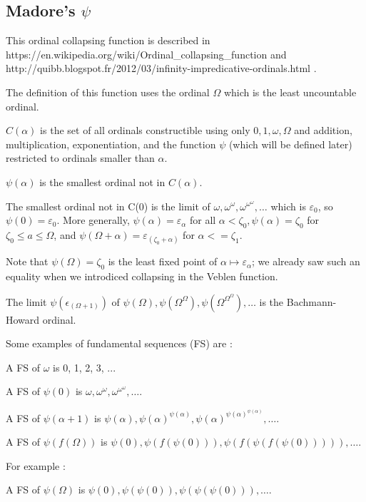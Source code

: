 \documentclass[10pt]{article}
\begin{document}
\subsection{Madore's \( \psi\)}

This ordinal collapsing function is described in https://en.wikipedia.org/wiki/Ordinal\_collapsing\_function and http://quibb.blogspot.fr/2012/03/infinity-impredicative-ordinals.html .

The definition of this function uses the ordinal \( \Omega \) which is the least uncountable ordinal. 

\( C(\alpha) \) is the set of all ordinals constructible using only \( 0, 1, \omega, \Omega \) and addition, multiplication, exponentiation, and the function \( \psi \) (which will be defined later) restricted to ordinals smaller than \( \alpha \).

\( \psi(\alpha) \) is the smallest ordinal not in \( C(\alpha) \). 

The smallest ordinal not in C(0) is the limit of \( \omega, \omega^\omega, \omega^{\omega^\omega}, \ldots \) which is \( \varepsilon_0 \), so \( \psi(0) = \varepsilon_0 \). More generally, \( \psi(\alpha) = \varepsilon_\alpha \) for all \( \alpha < \zeta_0, \psi(\alpha) = \zeta_0 \) for \( \zeta_0 \leq a \leq \Omega \), and \( \psi(\Omega+\alpha) = \varepsilon_(\zeta_0+\alpha) \) for \( \alpha <= \zeta_1 \). 

Note that \( \psi(\Omega) = \zeta_0 \) is the least fixed point of \( \alpha \mapsto \varepsilon_\alpha \); we already saw such an equality when we introdiced collapsing in the Veblen function.

The limit \( \psi(\epsilon_(\Omega+1)) \) of \( \psi(\Omega), \psi(\Omega^\Omega), \psi(\Omega^{\Omega^\Omega}), \ldots \) is the Bachmann-Howard ordinal. 

Some examples of fundamental sequences (FS) are :

A FS of \( \omega \) is 0, 1, 2, 3, ...

A FS of \( \psi(0) \) is \( \omega, \omega^\omega, \omega^{\omega^\omega}, \ldots \).

A FS of \( \psi(\alpha+1) \) is \( \psi(\alpha), \psi(\alpha)^{\psi(\alpha)}, \psi(\alpha)^{\psi(\alpha)^{\psi(\alpha)}}, \ldots \).

A FS of \( \psi(f(\Omega)) \) is \( \psi(0), \psi(f(\psi(0))), \psi(f(\psi(f(\psi(0))))), \ldots \).

For example :

A FS of \( \psi(\Omega) \) is \( \psi(0), \psi(\psi(0)), \psi(\psi(\psi(0))), \ldots \).
\end{document}
